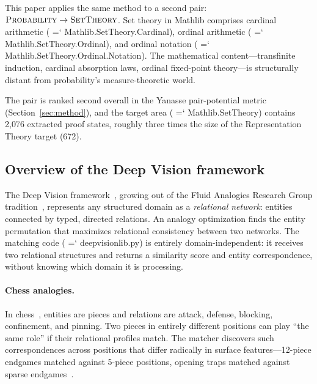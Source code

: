 \documentclass[11pt]{article}
\renewcommand{\texttt}[1]{%
  \begingroup\ttfamily\hyphenchar\font=`\-\relax
  \def\_{\textunderscore\discretionary{}{}{}}%
  #1\endgroup}
\theoremstyle{definition}
\theoremstyle{remark}
\begin{document}
This paper applies the same method to a second pair:
$\textsc{Probability} \to \textsc{SetTheory}$.  Set theory in
Mathlib comprises cardinal arithmetic
(\texttt{Mathlib.SetTheory.Cardinal}), ordinal arithmetic
(\texttt{Mathlib.SetTheory.Ordinal}), and ordinal notation
(\texttt{Mathlib.SetTheory.Ordinal.Notation}).  The mathematical
content---transfinite induction, cardinal absorption laws, ordinal
fixed-point theory---is structurally distant from probability's
measure-theoretic world.

The pair is ranked second overall in the Yanasse pair-potential
metric (Section~\ref{sec:method}), and the target area
(\texttt{Mathlib.SetTheory}) contains 2{,}076 extracted proof states,
roughly three times the size of the Representation Theory target (672).

\subsection{Overview of the Deep Vision framework}

The Deep Vision framework~\cite{linhares_deep_vision,
linhares2024deepvision}, growing out of the Fluid Analogies Research
Group tradition~\cite{hofstadter_fluid_1995, hofstadter_go_1999,
hofstadter_surfaces_2013}, represents any structured domain as a
\emph{relational network}: entities connected by typed, directed
relations.  An analogy optimization finds the entity permutation that
maximizes relational consistency between two networks.  The matching
code (\texttt{deep\_vision\_lib.py}) is entirely domain-independent:
it receives two relational structures and returns a similarity score
and entity correspondence, without knowing which domain it is
processing.

\paragraph{Chess analogies.}  In chess~\cite{linhares_active_2005,
linhares_understanding_2007, linhares_questioning_2010,
linhares_entanglement_2012, linhares_what_2013,
linhares_emergence_2014}, entities are pieces and relations are attack,
defense, blocking, confinement, and pinning.  Two pieces in entirely
different positions can play ``the same role'' if their relational
profiles match.  The matcher discovers such correspondences across
positions that differ radically in surface features---12-piece endgames
matched against 5-piece positions, opening traps matched against sparse
endgames~\cite{yanasse_part1}.
\end{document}
